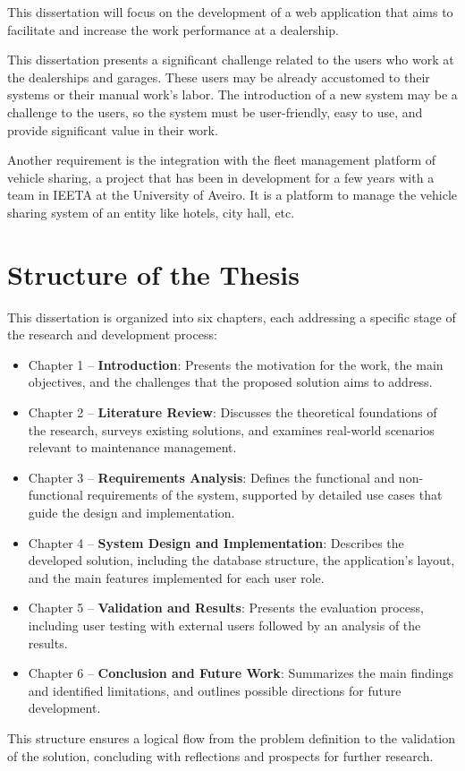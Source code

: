 This dissertation will focus on the development of a web application that aims to facilitate and increase the work performance at a dealership. 

This dissertation presents a significant challenge related to the users who work at the dealerships and garages. 
These users may be already accustomed to their systems or their manual work's labor.  
The introduction of a new system may be a challenge to the users, so the system must be user-friendly, easy to use, and provide significant value in their work.

Another requirement is the integration with the fleet management platform of vehicle sharing, a project that has been in development for a few years with a team in \ac{IEETA} at the University of Aveiro.
It is a platform to manage the vehicle sharing system of an entity like hotels, city hall, etc.  

\section{Structure of the Thesis}


This dissertation is organized into six chapters, each addressing a specific stage of the research and development process:


\begin{itemize}
    \item Chapter 1 – \textbf{Introduction}: Presents the motivation for the work, the main objectives, and the challenges that the proposed solution aims to address.
    \item Chapter 2 – \textbf{Literature Review}: Discusses the theoretical foundations of the research, surveys existing solutions, and examines real-world scenarios relevant to maintenance management.
    \item Chapter 3 – \textbf{Requirements Analysis}: Defines the functional and non-functional requirements of the system, supported by detailed use cases that guide the design and implementation.
    \item Chapter 4 – \textbf{System Design and Implementation}: Describes the developed solution, including the database structure, the application's layout, and the main features implemented for each user role.
    \item Chapter 5 – \textbf{Validation and Results}: Presents the evaluation process, including user testing with external users followed by an analysis of the results.
    \item Chapter 6 – \textbf{Conclusion and Future Work}: Summarizes the main findings and identified limitations, and outlines possible directions for future development.
\end{itemize}

This structure ensures a logical flow from the problem definition to the validation of the solution, concluding with reflections and prospects for further research.

